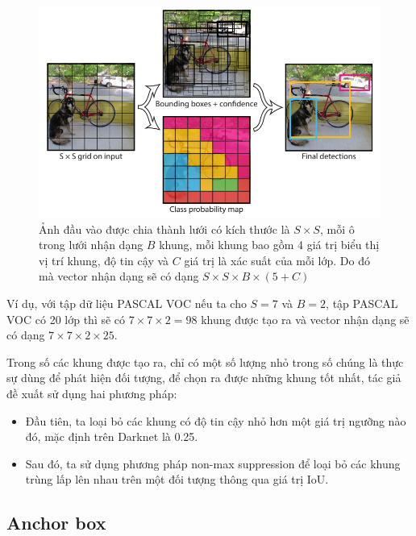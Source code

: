 \documentclass[../thesis.tex]{subfiles}
\begin{document}
\begin{figure}[H]
    \begin{center}
        \includegraphics[width=\linewidth]{images/yolo_idea.png}
    \end{center}
    \caption{Ảnh đầu vào được chia thành lưới có kích thước là $S \times S$, mỗi ô trong lưới nhận dạng $B$ khung, mỗi khung bao gồm 4 giá trị biểu thị vị trí khung, độ tin cậy và $C$ giá trị là xác suất của mỗi lớp. Do đó mà vector nhận dạng sẽ có dạng $S \times S \times B \times (5 + C)$}
    \label{yolo_idea}
\end{figure}

Ví dụ, với tập dữ liệu \textsc{PASCAL} VOC nếu ta cho $S = 7$ và $B = 2$, tập \textsc{PASCAL} VOC có 20 lớp thì sẽ có $7 \times 7 \times 2 = 98$ khung được tạo ra và vector nhận dạng sẽ có dạng $7 \times 7 \times 2 \times 25$.

Trong số các khung được tạo ra, chỉ có một số lượng nhỏ trong số chúng là thực sự dùng để phát hiện đối tượng, để chọn ra được những khung tốt nhất, tác giả đề xuất sử dụng hai phương pháp:

\begin{itemize}[topsep=0pt]
    \item Đầu tiên, ta loại bỏ các khung có độ tin cậy nhỏ hơn một giá trị ngưỡng nào đó, mặc định trên Darknet \cite{darknet} là 0.25.
    \item Sau đó, ta sử dụng phương pháp non-max suppression để loại bỏ các khung trùng lấp lên nhau trên một đối tượng thông qua giá trị IoU.
\end{itemize} 

\subsection{Anchor box}
\end{document}
